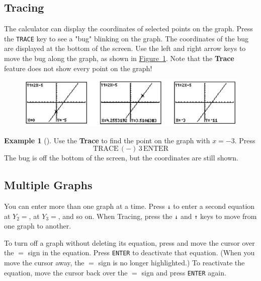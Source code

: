\documentclass[10pt,]{book}
\newcommand{\terminology}[1]{\textbf{#1}}
\theoremstyle{plain}
\theoremstyle{definition}
\theoremstyle{definition}
\newtheorem{example}[theorem]{Example}
\theoremstyle{definition}
\numberwithin{equation}{part}
\begin{document}
\subsection[{Tracing}]{Tracing}\label{subsection-77}
The calculator can display the coordinates of selected points on the graph. Press the \lstinline?TRACE? key to see a "bug" blinking on the graph. The coordinates of the bug are displayed at the bottom of the screen. Use the left and right arrow keys to move the bug along the graph, as shown in \hyperref[fig-GC-tracing]{Figure~\ref{fig-GC-tracing}}. Note that the \terminology{Trace} feature does not show every point on the graph! \leavevmode%
\begin{figure}
\centering
\includegraphics[width=1\linewidth]{images/fig-GC-tracing.jpg}
\caption{\label{fig-GC-tracing}}
\end{figure}
%
\begin{example}[]\label{example-116}
Use the \terminology{Trace} to find the point on the graph with \(x=-3\). Press%
\begin{equation*}
\boxed{\text{TRACE}} \, \boxed{(-)} \, 3 \, \boxed{\text{ENTER}} 
\end{equation*}
The bug is off the bottom of the screen, but the coordinates are still shown.%
\end{example}
\typeout{************************************************}
\typeout{************************************************}
\subsection[{Multiple Graphs}]{Multiple Graphs}\label{subsection-78}
You can enter more than one graph at a time. Press \lstinline?↓? to enter a second equation at \(Y_2 =\), at \(Y_3 =\), and so on. When Tracing, press the \lstinline?↓?  and \lstinline?↑? keys to move from one graph to another.%
\par
To turn off a graph without deleting its equation, press and move the cursor over the \(=\) sign in the equation. Press \lstinline?ENTER? to deactivate that equation. (When you move the cursor away, the \(=\) sign is no longer highlighted.) To reactivate the equation, move the cursor back over the \(=\) sign and press \lstinline?ENTER? again.%
\typeout{************************************************}
\typeout{************************************************}
\end{document}
